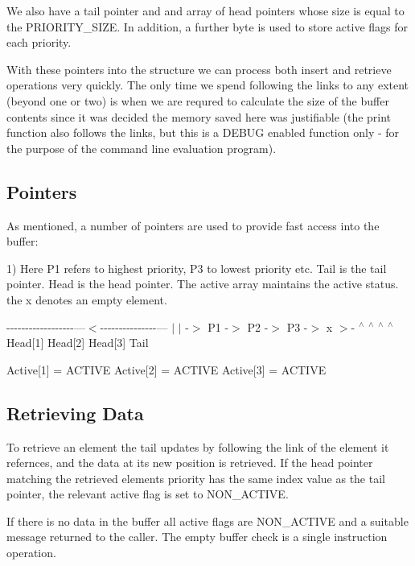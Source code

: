 We also have a tail pointer and and array of head pointers whose size is equal to the P\+R\+I\+O\+R\+I\+T\+Y\+\_\+\+S\+I\+ZE. In addition, a further byte is used to store active flags for each priority.

With these pointers into the structure we can process both insert and retrieve operations very quickly. The only time we spend following the links to any extent (beyond one or two) is when we are requred to calculate the size of the buffer contents since it was decided the memory saved here was justifiable (the print function also follows the links, but this is a D\+E\+B\+UG enabled function only -\/ for the purpose of the command line evaluation program).

\subsection*{Pointers}

As mentioned, a number of pointers are used to provide fast access into the buffer\+:

1) Here P1 refers to highest priority, P3 to lowest priority etc. Tail is the tail pointer. Head is the head pointer. The active array maintains the active status. the x denotes an empty element.

-\/-\/-\/-\/-\/-\/-\/-\/-\/-\/-\/-\/-\/-\/-\/-\/-\/-\/---$<$-\/-\/-\/-\/-\/-\/-\/-\/-\/-\/-\/-\/-\/-\/-\/--- $\vert$ $\vert$ -\/$>$ P1 -\/$>$ P2 -\/$>$ P3 -\/$>$ x $>$-\/ $^\wedge$ $^\wedge$ $^\wedge$ $^\wedge$ Head\mbox{[}1\mbox{]} Head\mbox{[}2\mbox{]} Head\mbox{[}3\mbox{]} Tail

Active\mbox{[}1\mbox{]} = A\+C\+T\+I\+VE Active\mbox{[}2\mbox{]} = A\+C\+T\+I\+VE Active\mbox{[}3\mbox{]} = A\+C\+T\+I\+VE

\subsection*{Retrieving Data}

To retrieve an element the tail updates by following the link of the element it refernces, and the data at its new position is retrieved. If the head pointer matching the retrieved element\textquotesingle{}s priority has the same index value as the tail pointer, the relevant active flag is set to N\+O\+N\+\_\+\+A\+C\+T\+I\+VE.

If there is no data in the buffer all active flags are N\+O\+N\+\_\+\+A\+C\+T\+I\+VE and a suitable message returned to the caller. The empty buffer check is a single instruction operation.

